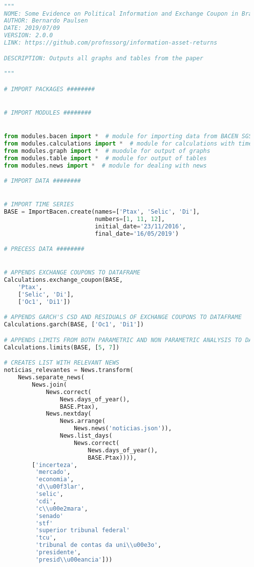 \begin{lstlisting}[language=Python]

"""
NOME: Some Evidence on Political Information and Exchange Coupon in Brazil - main
AUTHOR: Bernardo Paulsen
DATE: 2019/07/09
VERSION: 2.0.0
LINK: https://github.com/profnssorg/information-asset-returns

DESCRIPTION: Outputs all graphs and tables from the paper

"""

# IMPORT PACKAGES ########


# IMPORT MODULES ########


from modules.bacen import *  # module for importing data from BACEN SGS
from modules.calculations import *  # module for calculations with time series
from modules.graph import *  # muodule for output of graphs
from modules.table import *  # module for output of tables
from modules.news import *  # module for dealing with news

# IMPORT DATA ########


# IMPORT TIME SERIES
BASE = ImportBacen.create(names=['Ptax', 'Selic', 'Di'],
                          numbers=[1, 11, 12],
                          initial_date='23/11/2016',
                          final_date='16/05/2019')

# PRECESS DATA ########


# APPENDS EXCHANGE COUPONS TO DATAFRAME
Calculations.exchange_coupon(BASE,
    'Ptax',
    ['Selic', 'Di'],
    ['Oc1', 'Di1'])

# APPENDS GARCH'S CSD AND RESIDUALS OF EXCHANGE COUPONS TO DATAFRAME
Calculations.garch(BASE, ['Oc1', 'Di1'])

# APPENDS LIMITS FROM BOTH PARAMETRIC AND NON PARAMETRIC ANALYSIS TO DATAFRAME
Calculations.limits(BASE, [5, 7])

# CREATES LIST WITH RELEVANT NEWS
noticias_relevantes = News.transform(
    News.separate_news(
        News.join(
            News.correct(
                News.days_of_year(),
                BASE.Ptax),
            News.nextday(
                News.arrange(
                    News.news('noticias.json')),
                News.list_days(
                    News.correct(
                        News.days_of_year(),
                        BASE.Ptax)))),
        ['incerteza',
         'mercado',
         'economia',
         'd\\u00f3lar',
         'selic',
         'cdi',
         'c\\u00e2mara',
         'senado'
         'stf'
         'superior tribunal federal'
         'tcu',
         'tribunal de contas da uni\\u00e3o',
         'presidente',
         'presid\\u00eancia']))


\end{lstlisting}
